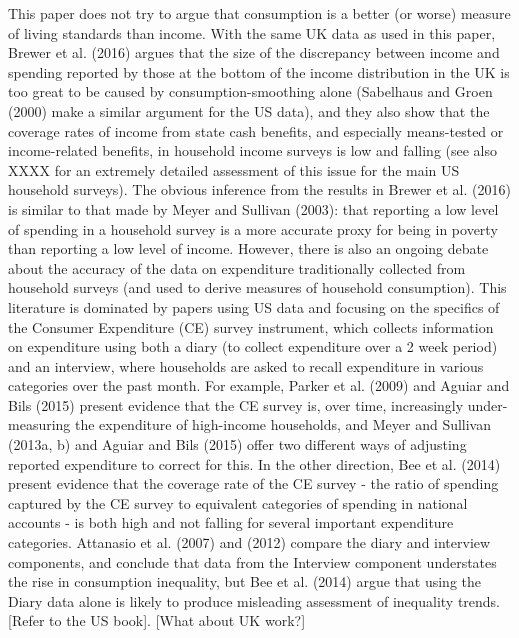 This paper does not try to argue that consumption is a better (or worse) measure of living standards than income. With the same UK data as used in this paper, Brewer et al. (2016) argues that the size of the discrepancy between income and spending reported by those at the bottom of the income distribution in the UK is too great to be caused by consumption-smoothing alone (Sabelhaus and Groen (2000) make a similar argument for the US data), and they also show that the coverage rates of income from state cash benefits, and especially means-tested or income-related benefits, in household income surveys is low and falling (see also XXXX for an extremely detailed assessment of this issue for the main US household surveys). The obvious inference from the results in Brewer et al. (2016) is similar to that made by Meyer and Sullivan (2003): that reporting a low level of spending in a household survey is a more accurate proxy for being in poverty than reporting a low level of income.  However, there is also an ongoing debate about the accuracy of the data on expenditure traditionally collected from household surveys (and used to derive measures of household consumption). This literature is dominated by papers using US data and focusing on the specifics of the Consumer Expenditure (CE) survey instrument, which collects information on expenditure using both a diary (to collect expenditure over a 2 week period) and an interview, where households are asked to recall expenditure in various categories over the past month. For example, Parker et al. (2009) and Aguiar and Bils (2015) present evidence that the CE survey is, over time, increasingly under-measuring the expenditure of high-income households, and Meyer and Sullivan (2013a, b) and Aguiar and Bils (2015) offer two different ways of adjusting reported expenditure to correct for this. In the other direction, Bee et al. (2014) present evidence that the coverage rate of the CE survey - the ratio of spending captured by the CE survey to equivalent categories of spending in national accounts - is both high and not falling for several important expenditure categories. Attanasio et al. (2007) and (2012) compare the diary and interview components, and conclude that data from the Interview component understates the rise in consumption inequality, but Bee et al. (2014) argue that using the Diary data alone is likely to produce misleading assessment of inequality trends. [Refer to the US book]. [What about UK work?]

